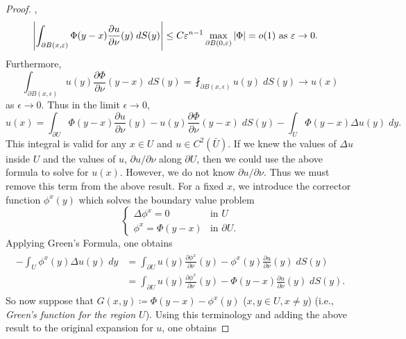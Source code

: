 \documentclass{article}
\begin{document}
\begin{itemize}
\begin{proof}
{			}, 
			\begin{align*}
				\begin{split}
					\left| \int_{\partial B(x, \varepsilon)}\Phi(y - x)\frac{\partial u}{\partial \nu}(y)\;dS(y) \right| &\leq C\varepsilon^{n-1}\max_{\partial B(0,\varepsilon)}|\Phi| = o(1) \text{ as $\varepsilon \to 0$}. 
				\end{split}
			\end{align*}
			Furthermore, 
			\begin{equation*}
				\int_{\partial B(x, \epsilon)}u(y)\frac{\partial \Phi}{\partial\nu}(y - x)\;dS(y) = \fint_{\partial B(x,\epsilon)}u(y)\;dS(y) \to u(x)
			\end{equation*}
			as $\epsilon \to 0$. Thus in the limit $\epsilon \to0$, 
			\begin{equation*}
				u(x) = \int_{\partial U}\Phi(y- x)\frac{\partial u}{\partial \nu}(y) - u(y)\frac{\partial \Phi}{\partial \nu}(y -x)\;dS(y) - \int_{U}\Phi(y - x)\Delta u(y)\;dy. 
			\end{equation*}
			This integral is valid for any $x \in U$ and $u \in C^{2}(\bar{U})$. If we knew the values of $\Delta u$ inside $U$ and the values of $u$, $\partial u/\partial \nu$ along $\partial U$, then we could use the above formula to solve for $u(x)$. However, we do not know $\partial u/\partial \nu$. Thus we must remove this term from the above result. For a fixed $x$, we introduce the corrector function $\phi^{x}(y)$ which solves the boundary value problem 
			\begin{equation*}
				\begin{cases}
					\Delta \phi^{x} = 0 &\text{in $U$} \\
					\phi^{x} = \Phi(y - x) & \text{in $\partial U$}. 
				\end{cases}
			\end{equation*}
			Applying Green's Formula, one obtains 
			\begin{align*}
				\begin{split}
					-\int_{U}\phi^{x}(y)\Delta u(y)\;dy &= \int_{\partial U}u(y)\frac{\partial \phi^{x}}{\partial \nu}(y) - \phi^{x}(y)\frac{\partial u}{\partial \nu}(y)\;dS(y) \\
					&= \int_{\partial U}u(y)\frac{\partial \phi^{x}}{\partial \nu}(y) - \Phi(y - x)\frac{\partial u}{\partial \nu}(y)\;dS(y). 
				\end{split}
			\end{align*}
			So now suppose that $G(x, y) \coloneqq \Phi(y - x) - \phi^{x}(y)$ ($x, y \in U, x \neq y$) (i.e., \textit{Green's function for the region $U$}). Using this terminology and adding the above result to the original expansion for $u$, one obtains 

\end{proof}
\end{itemize}
\end{document}
